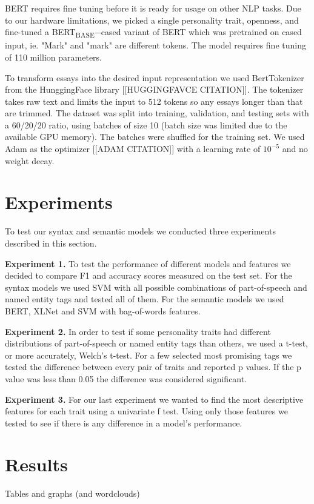 \documentclass[10pt, a4paper]{article}
\begin{document}
BERT requires fine tuning before it is ready for usage on other NLP tasks. 
Due to our hardware limitations, we picked a single personality trait, openness, and fine-tuned a BERT\textsubscript{BASE}$-$cased variant of BERT which was pretrained on cased input, ie. "Mark" and "mark" are different tokens. 
The model requires fine tuning of 110 million parameters.

To transform essays into the desired input representation we used BertTokenizer from the HunggingFace library [[HUGGINGFAVCE CITATION]]. 
The tokenizer takes raw text and limits the input to 512 tokens so any essays longer than that are trimmed. 
The dataset was split into training, validation, and testing sets with a 60/20/20 ratio, using batches of size 10 (batch size was limited due to the available GPU memory). 
The batches were shuffled for the training set. We used Adam as the optimizer [[ADAM CITATION]] with a learning rate of $10^{-5}$ and no weight decay.

\section{Experiments}
To test our syntax and semantic models we conducted three experiments described in this section.

\textbf{Experiment 1.} To test the performance of different models and features we decided to compare F1 and accuracy scores measured on the test set.
For the syntax models we used SVM with all possible combinations of part-of-speech and named entity tags and tested all of them.
For the semantic models we used BERT, XLNet and SVM with bag-of-words features.

\textbf{Experiment 2.}  In order to test if some personality traits had different distributions of part-of-speech or named entity tags than others, we used a t-test, or more accurately, Welch’s t-test.
For a few selected most promising tags we tested the difference between every pair of traits and reported p values.
If the p value was less than 0.05 the difference was considered significant.

\textbf{Experiment 3.} For our last experiment we wanted to find the most descriptive features for each trait using a univariate f test.
Using only those features we tested to see if there is any difference in a model's performance.

\section{Results}
Tables and graphs (and wordclouds)
\end{document}
